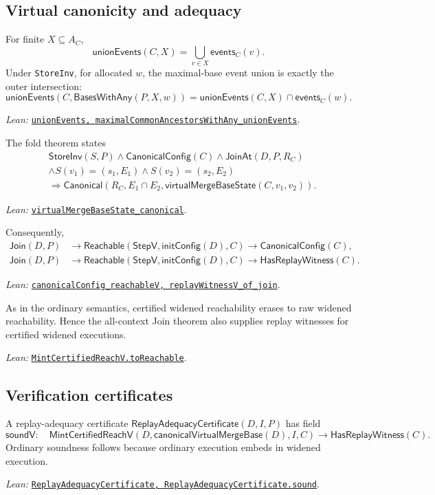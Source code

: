 \documentclass[11pt]{article}
\theoremstyle{definition}
\newcommand{\Can}{\mathsf{Canonical}}
\newcommand{\lean}[1]{\texttt{#1}}
\newcommand{\src}[2]{\href{../../#1}{\texttt{#2}}}
\newcommand{\anchor}[2]{\par\smallskip\noindent\emph{Lean: }\src{#1}{#2}.}
\begin{document}
\subsection{Virtual canonicity and adequacy}

For finite $X\subseteq A_C$,
\[
 \mathsf{unionEvents}(C,X)=
 \bigcup_{v\in X}\mathsf{events}_C(v).
\]
Under \lean{StoreInv}, for allocated $w$, the maximal-base event union is
exactly the outer intersection:
\[
 \mathsf{unionEvents}(C,\mathsf{BasesWithAny}(P,X,w))
 =\mathsf{unionEvents}(C,X)\cap\mathsf{events}_C(w).
\]
\anchor{Sal/MRDTs/Metatheory/VirtualAdequacy.lean}
  {unionEvents, maximalCommonAncestorsWithAny\_unionEvents}

The fold theorem states
\[
\begin{aligned}
 &\mathsf{StoreInv}(S,P)\land\mathsf{CanonicalConfig}(C)
 \land\mathsf{JoinAt}(D,P,R_C)\\
 &\land S(v_1)=(s_1,E_1)\land S(v_2)=(s_2,E_2)\\
 &\Longrightarrow
 \Can(R_C,E_1\cap E_2,\mathsf{virtualMergeBaseState}(C,v_1,v_2)).
\end{aligned}
\]
\anchor{Sal/MRDTs/Metatheory/VirtualAdequacy.lean}
  {virtualMergeBaseState\_canonical}

Consequently,
\[
\begin{aligned}
 \mathsf{Join}(D,P)&\to
 \mathsf{Reachable}(\mathsf{StepV},
   \mathsf{initConfig}(D),C)
 \to\mathsf{CanonicalConfig}(C),\\
 \mathsf{Join}(D,P)&\to
 \mathsf{Reachable}(\mathsf{StepV},
   \mathsf{initConfig}(D),C)
 \to\mathsf{HasReplayWitness}(C).
\end{aligned}
\]
\anchor{Sal/MRDTs/Metatheory/VirtualAdequacy.lean}
  {canonicalConfig\_reachableV, replayWitnessV\_of\_join}

As in the ordinary semantics, certified widened reachability erases to raw
widened reachability. Hence the all-context Join theorem also supplies
replay witnesses for certified widened executions.
\anchor{Sal/MRDTs/Framework/Certificates.lean}
  {MintCertifiedReachV.toReachable}

\subsection{Verification certificates}
\label{sec:certificates}

A replay-adequacy certificate
$\mathsf{ReplayAdequacyCertificate}(D,I,P)$ has field
\[
 \mathsf{soundV}:\quad
 \mathsf{MintCertifiedReachV}(D,\mathsf{canonicalVirtualMergeBase}(D),I,C)
 \to\mathsf{HasReplayWitness}(C).
\]
Ordinary soundness follows because ordinary execution embeds in widened
execution.
\anchor{Sal/MRDTs/Metatheory/Correctness.lean}
  {ReplayAdequacyCertificate, ReplayAdequacyCertificate.sound}
\end{document}
